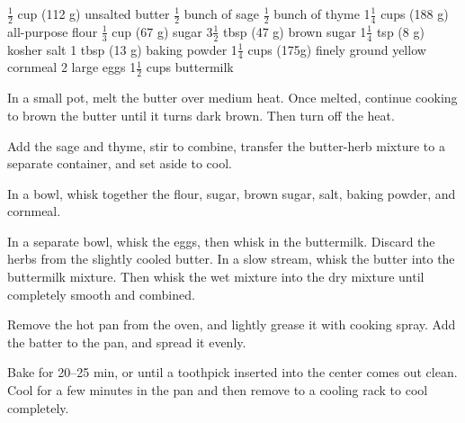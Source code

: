 \dishtype{\bread}
\dishother{\vegetarian}
\begin{ingreds}
    $\frac{1}{2}$ cup (112 g) unsalted butter
    $\frac{1}{2}$ bunch of sage
    $\frac{1}{2}$ bunch of thyme
    1$\frac{1}{4}$ cups (188 g) all-purpose flour
    $\frac{1}{3}$ cup (67 g) sugar
    3$\frac{1}{2}$ tbsp (47 g) brown sugar
    1$\frac{1}{4}$ tsp (8 g) kosher salt
    1 tbsp (13 g) baking powder
    1$\frac{1}{4}$ cups (175g) finely ground yellow cornmeal
    2 large eggs
    1$\frac{1}{2}$ cups buttermilk
\end{ingreds}
\begin{method}
    In a small pot, melt the butter over medium heat. Once melted, continue cooking to brown the butter until it turns dark brown. Then turn off the heat.\par
    Add the sage and thyme, stir to combine, transfer the butter-herb mixture to a separate container, and set aside to cool.\par
    In a bowl, whisk together the flour, sugar, brown sugar, salt, baking powder, and cornmeal.\par
    In a separate bowl, whisk the eggs, then whisk in the buttermilk.
    Discard the herbs from the slightly cooled butter. In a slow stream, whisk the butter into the buttermilk mixture. Then whisk the wet mixture into the dry mixture until completely smooth and combined.\par
    Remove the hot pan from the oven, and lightly grease it with cooking spray. Add the batter to the pan, and spread it evenly.\par
    Bake for 20--25 min, or until a toothpick inserted into the center comes out clean. 
    Cool for a few minutes in the pan and then remove to a cooling rack to cool completely.\par
\end{method}